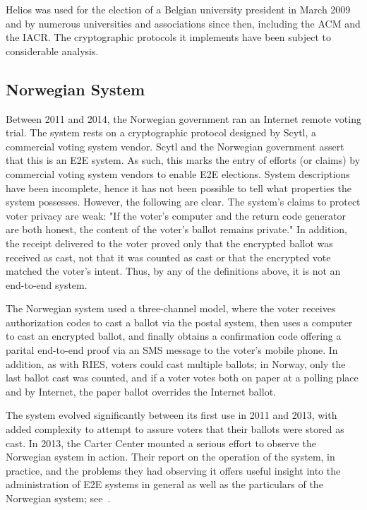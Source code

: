 Helios was used for the election of a Belgian university president in March
2009 and by numerous universities and associations since then, including the
ACM and the IACR. The cryptographic protocols it implements have been
subject to considerable analysis.

\subsection{Norwegian System~\cite{gjosteen2012}}

Between 2011 and 2014, the Norwegian government ran an Internet remote
voting trial.  The system rests on a cryptographic protocol designed by
Scytl, a commercial voting system vendor. Scytl and the Norwegian government
assert that this is an E2E system.  As such, this marks the entry of efforts
(or claims) by commercial voting system vendors to enable E2E elections.
System descriptions have been incomplete, hence it has not been possible to
tell what properties the system possesses. However, the following are clear.
The system's claims to protect voter privacy are weak: "If the voter's
computer and the return code generator are both honest, the content of the
voter's ballot remains private."  In addition, the receipt delivered to the
voter proved only that the encrypted ballot was received as cast, not that
it was counted as cast or that the encrypted vote matched the voter's
intent. Thus, by any of the definitions above, it is not an end-to-end
system.

The Norwegian system used a three-channel model, where the voter receives
authorization codes to cast a ballot via the postal system, then uses a
computer to cast an encrypted ballot, and finally obtains a confirmation
code offering a parital end-to-end proof via an SMS message to the voter's
mobile phone.  In addition, as with RIES, voters could cast multiple
ballots; in Norway, only the last ballot cast was counted, and if a voter
votes both on paper at a polling place and by Internet, the paper ballot
overrides the Internet ballot.

The system evolved significantly between its first use in 2011 and 2013,
with added complexity to attempt to assure voters that their ballots were
stored as cast.  In 2013, the Carter Center mounted a serious effort to
observe the Norwegian system in action.  Their report on the operation of
the system, in practice, and the problems they had observing it offers
useful insight into the administration of E2E systems in general as well as
the particulars of the Norwegian system; see~\cite{carter2013}.

